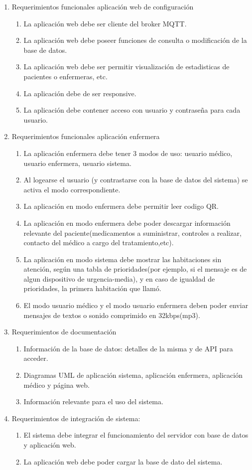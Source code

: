 \documentclass[
11pt, %
]{charter}
\begin{document}
\begin{enumerate}
\begin{enumerate}
		\end{enumerate}	
	\item Requerimientos funcionales aplicación web de configuración
		\begin{enumerate}	
		\item La aplicación web debe ser cliente del broker MQTT.
		\item La aplicación web debe poseer funciones de consulta o modificación de la base de datos.
		\item La aplicación web debe ser permitir visualización de estadisticas de pacientes o enfermeras, etc.
		\item La aplicación debe de ser responsive.
		\item La aplicación debe contener acceso con usuario y contraseña para cada usuario.
		\end{enumerate}			
	\item Requerimientos funcionales aplicación enfermera
		\begin{enumerate}
			\item La aplicación enfermera debe tener 3 modos de uso: usuario médico, usuario enfermera, usuario sistema.
			\item Al logearse el usuario (y contrastarse con la base de datos del sistema) se activa el modo correspondiente.
			\item La aplicación en modo enfermera debe permitir leer codigo QR.			
			\item La aplicación en modo enfermera debe poder descargar información relevante del paciente(medicamentos a suministrar, controles a realizar, contacto del médico a cargo del tratamiento,etc).	
			\item La aplicación en modo sistema debe mostrar las habitaciones sin atención,  según una tabla de prioridades(por ejemplo, si el mensaje es de algun dispositivo de urgencia-media), y en caso de igualdad de prioridades, la primera habitación que llamó.
			\item El modo usuario médico y el modo usuario enfermera deben poder enviar mensajes de textos o sonido comprimido en 32kbps(mp3).
			
		\end{enumerate}
	\item Requerimientos de documentación
		\begin{enumerate}
			\item Información de la base de datos: detalles de la misma y de API para acceder.
			\item Diagramas UML de aplicación sistema, aplicación enfermera, aplicación médico y página web.
			\item Información relevante para el uso del sistema.
		\end{enumerate}
	\item Requerimientos de integración de sistema:	
			\begin{enumerate}
			\item El sistema debe integrar el funcionamiento del servidor con base de datos y aplicación web.
			\item La aplicación web debe poder cargar la base de dato del sistema.
			\end{enumerate}	
	


\end{enumerate}
\end{document}
